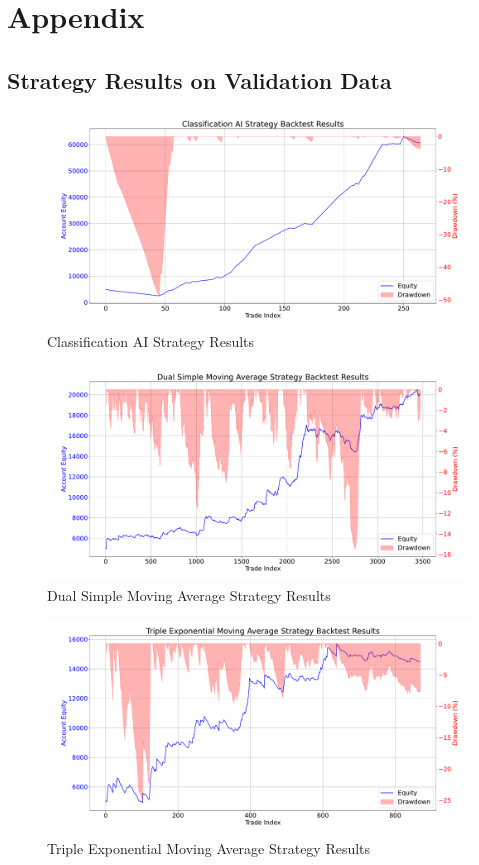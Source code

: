 \section{Appendix}

\subsection{Strategy Results on Validation Data}
\label{chap:strategy-results-on-validation-data}

\begin{figure}[H]
    \centering
    \includegraphics[width=\textwidth]{images/backtests/classification-results}
    \caption{Classification AI Strategy Results}
\end{figure}

\begin{figure}[H]
    \centering
    \includegraphics[width=\textwidth]{images/backtests/dual-sma-results}
    \caption{Dual Simple Moving Average Strategy Results}
\end{figure}

\begin{figure}[H]
    \centering
    \includegraphics[width=\textwidth]{images/backtests/triple-ema-results}
    \caption{Triple Exponential Moving Average Strategy Results}
\end{figure}

